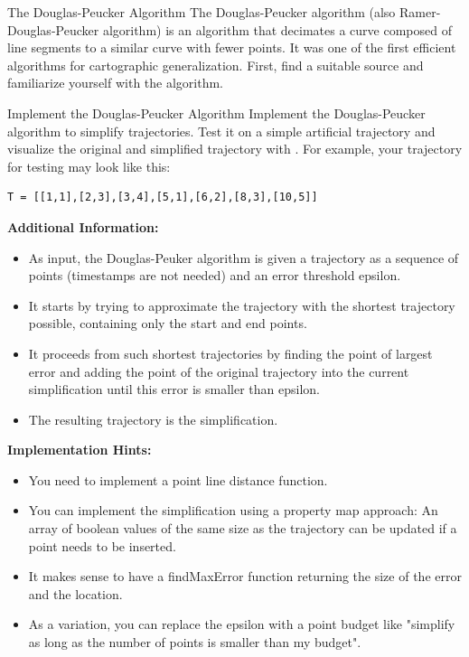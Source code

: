 \documentclass[twoside]{article}
\begin{document}
\maketitle

\begin{task}{The Douglas-Peucker Algorithm}{}{}
The Douglas-Peucker algorithm (also Ramer-Douglas-Peucker algorithm) is an algorithm that decimates a curve composed of line segments to a similar curve with fewer points.
It was one of the first efficient algorithms for cartographic generalization.
First, find a suitable source and familiarize yourself with the algorithm.
\end{task}


\begin{task}{Implement the Douglas-Peucker Algorithm}{}{}
Implement the Douglas-Peucker algorithm to simplify trajectories.
Test it on a simple artificial trajectory and visualize the original and simplified trajectory with . For example, your trajectory for testing may look like this:
\begin{lstlisting}[numbers=none]
T = [[1,1],[2,3],[3,4],[5,1],[6,2],[8,3],[10,5]]
\end{lstlisting}

\vspace{10pt}

\textbf{Additional Information:}
\begin{itemize}
    \item As input, the Douglas-Peuker algorithm is given a trajectory as a sequence of points (timestamps are not needed) and an error threshold epsilon. 
    \item It starts by trying to approximate the trajectory with the shortest trajectory possible, containing only the start and end points. 
    \item It proceeds from such shortest trajectories by finding the point of largest error and adding the point of the original trajectory into the current simplification until this error is smaller than epsilon.
    \item The resulting trajectory is the simplification.
\end{itemize}

\clearpage


\textbf{Implementation Hints:}
\begin{itemize}
    \item You need to implement a point line distance function.
    \item You can implement the simplification using a property map approach: An array of boolean values of the same size as the trajectory can be updated if a point needs to be inserted.
    \item It makes sense to have a findMaxError function returning the size of the error and the location.
    \item As a variation, you can replace the epsilon with a point budget like "simplify as long as the number of points is smaller than my budget".
\end{itemize}

\end{task}
\end{document}
